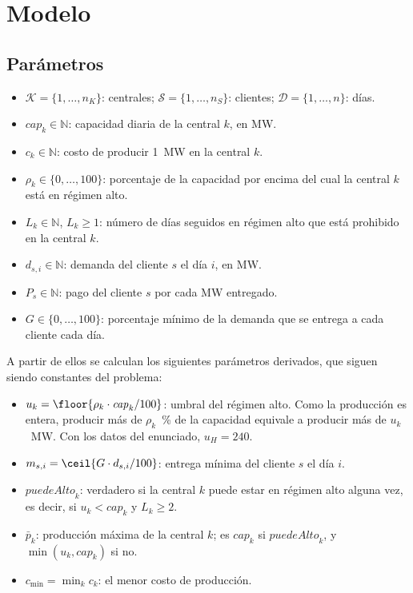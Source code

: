 \section{Modelo}

\subsection{Parámetros}

\begin{itemize}
    \item $\mathcal{K} = \{1, \dots, n_K\}$: centrales; $\mathcal{S} = \{1, \dots, n_S\}$: clientes; $\mathcal{D} = \{1, \dots, n\}$: días.
    \item $\mathit{cap}_k \in \mathbb{N}$: capacidad diaria de la central $k$, en MW.
    \item $c_k \in \mathbb{N}$: costo de producir 1~MW en la central $k$.
    \item $\rho_k \in \{0, \dots, 100\}$: porcentaje de la capacidad por encima del cual la central $k$ está en régimen alto.
    \item $L_k \in \mathbb{N}$, $L_k \ge 1$: número de días seguidos en régimen alto que está prohibido en la central $k$.
    \item $d_{s,i} \in \mathbb{N}$: demanda del cliente $s$ el día $i$, en MW.
    \item $P_s \in \mathbb{N}$: pago del cliente $s$ por cada MW entregado.
    \item $G \in \{0, \dots, 100\}$: porcentaje mínimo de la demanda que se entrega a cada cliente cada día.
\end{itemize}

A partir de ellos se calculan los siguientes parámetros derivados, que siguen siendo constantes del problema:

\begin{itemize}
    \item $u_k = \floor{\rho_k \cdot \mathit{cap}_k / 100}$: umbral del régimen alto. Como la producción es entera, producir más de $\rho_k$~\% de la capacidad equivale a producir más de $u_k$~MW. Con los datos del enunciado, $u_H = 240$.
    \item $m_{s,i} = \ceil{G \cdot d_{s,i} / 100}$: entrega mínima del cliente $s$ el día $i$.
    \item $\mathit{puedeAlto}_k$: verdadero si la central $k$ puede estar en régimen alto alguna vez, es decir, si $u_k < \mathit{cap}_k$ y $L_k \ge 2$.
    \item $\bar{p}_k$: producción máxima de la central $k$; es $\mathit{cap}_k$ si $\mathit{puedeAlto}_k$, y $\min(u_k, \mathit{cap}_k)$ si no.
    \item $c_{\min} = \min_k c_k$: el menor costo de producción.
\end{itemize}


